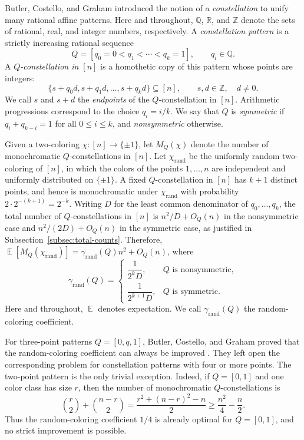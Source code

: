\documentclass[twoside,12pt]{article}
\newcommand{\Q}{\mathbb{Q}}
\newcommand{\R}{\mathbb{R}}
\newcommand{\Z}{\mathbb{Z}}
\newcommand{\rand}{\mathrm{rand}}
\DeclareMathOperator{\E}{\mathbb{E}}
\newcommand{\1}{\mathbf 1}
\begin{document}
Butler, Costello, and Graham \cite{BCG10} introduced the notion of a \emph{constellation} to unify many rational affine patterns.  Here and throughout, \(\Q\), \(\R\), and
\(\Z\) denote the sets of rational, real, and integer numbers, respectively. A
\textit{constellation pattern} is a strictly increasing rational sequence
\[
Q=[q_0=0<q_1<\cdots<q_k=1],
\qquad q_i\in\Q.
\]
A \emph{\(Q\)-constellation in \([n]\)} is a homothetic copy of this pattern
whose points are integers:
\[
\{s+q_0d,s+q_1d,\dots,s+q_kd\}\subseteq [n],
\qquad s,d\in\Z,\quad d\ne 0.
\]
We call \(s\) and \(s+d\) the \emph{endpoints} of the \(Q\)-constellation in
\([n]\).  Arithmetic progressions correspond to the choice \(q_i=i/k\).  We
say that \(Q\) is \emph{symmetric} if \(q_i+q_{k-i}=1\) for all
\(0\le i\le k\), and \emph{nonsymmetric} otherwise.

Given a two-coloring \(\chi:[n]\to\{\pm1\}\), let \(M_Q(\chi)\) denote the
number of monochromatic \(Q\)-constellations in \([n]\).  Let \(\chi_{\rand}\)
be the uniformly random two-coloring of \([n]\), in which the colors of the
points \(1,\dots,n\) are independent and uniformly distributed on
\(\{\pm1\}\).  A fixed \(Q\)-constellation in \([n]\) has \(k+1\) distinct
points, and hence is monochromatic under \(\chi_{\rand}\) with probability
\(2\cdot 2^{-(k+1)}=2^{-k}\).  Writing \(D\) for the least common denominator
of \(q_0,\dots,q_k\), the total number of \(Q\)-constellations in \([n]\) is
\(n^2/D+O_Q(n)\) in the nonsymmetric case and \(n^2/(2D)+O_Q(n)\) in the
symmetric case, as justified in Subsection~\ref{subsec:total-counts}.  Therefore, $\E\!\left[M_Q(\chi_{\rand})\right]
=
\gamma_{\rand}(Q)n^2+O_Q(n)$,
where
\[
\gamma_{\rand}(Q)=
\begin{cases}
\dfrac{1}{2^kD}, & Q \text{ is nonsymmetric},\\[8pt]
\dfrac{1}{2^{k+1}D}, & Q \text{ is symmetric}.
\end{cases}
\]
Here and throughout, \(\E\) denotes expectation. We call \(\gamma_{\rand}(Q)\) the random-coloring coefficient.

For three-point patterns \(Q=[0,q,1]\), Butler, Costello, and Graham proved
that the random-coloring coefficient can always be improved \cite{BCG10}.  They
left open the corresponding problem for constellation patterns with four or
more points.  The two-point pattern is the only trivial exception.  Indeed, if
\(Q=[0,1]\) and one color class has size \(r\), then the number of
monochromatic \(Q\)-constellations is
\[
\binom r2+\binom{n-r}{2}
=
\frac{r^2+(n-r)^2-n}{2}
\ge
\frac{n^2}{4}-\frac n2.
\]
Thus the random-coloring coefficient \(1/4\) is already optimal for
\(Q=[0,1]\), and no strict improvement is possible.
\end{document}
